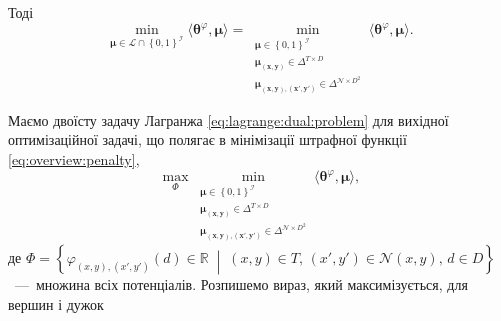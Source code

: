 Тоді
\begin{equation*}
    \min \limits_{\pmb{\mu} \in \mathcal{L} \cap \left\{0, 1 \right\}^{\mathcal{I}}}
        \langle \pmb{\theta}^{\varphi}, \pmb{\mu} \rangle =
    \min \limits_{\substack{\pmb{\mu} \in \left\{ 0, 1 \right\}^{\mathcal{I}} \\
                            \pmb{\mu_{\left(x, y \right)}} \in \Delta^{T \times D} \\
                            \pmb{\mu_{\left(x, y \right), \left(x', y' \right)}} \in
                                \Delta^{\mathcal{N} \times D^2}}}
        \langle \pmb{\theta}^{\varphi}, \pmb{\mu} \rangle.
\end{equation*}

Маємо двоїсту задачу Лагранжа \eqref{eq:lagrange:dual:problem}
для вихідної оптимізаційної задачі,
що полягає в мінімізації штрафної функції \eqref{eq:overview:penalty},
\begin{equation*}
    \max \limits_{\Phi}
        \min \limits_{\substack{\pmb{\mu} \in \left\{ 0, 1 \right\}^{\mathcal{I}} \\
                                \pmb{\mu_{\left(x, y \right)}} \in \Delta^{T \times D} \\
                                \pmb{\mu_{\left(x, y \right), \left(x', y' \right)}} \in
                                    \Delta^{\mathcal{N} \times D^2}}}
            \langle \pmb{\theta}^{\varphi}, \pmb{\mu} \rangle,
\end{equation*}
де
$\Phi = \left\{
    \varphi_{\left(x, y \right), \left(x', y' \right)} \left(
        d
    \right) \in \mathbb{R} \; \middle| \;
    \left(x, y \right) \in T, \,
    \left(x', y' \right) \in \mathcal{N} \left(x, y \right), \,
    d \in D
\right\}$~---~множина всіх потенціалів.
Розпишемо вираз, який максимізується, для вершин і дужок
